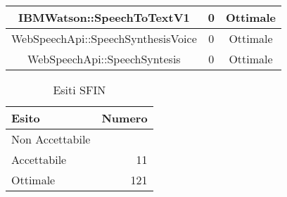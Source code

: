 \begin{longtable}{|c|c|c|}
\hline IBMWatson::SpeechToTextV1 & 0 & Ottimale \\
\hline WebSpeechApi::SpeechSynthesisVoice & 0 & Ottimale \\
\hline WebSpeechApi::SpeechSyntesis & 0 & Ottimale \\
\hline \end{longtable}\begin{table}[h]
\centering
\begin{tabular}{l r}
	\hline
	\rule[-0.3cm]{0cm}{0.8cm}
	\textbf{Esito} & \textbf{Numero} \\
	\hline
	\rule[0cm]{0cm}{0.4cm}
	Non Accettabile &  \\
	\rule[0cm]{0cm}{0.4cm}
	Accettabile & 11 \\
	\rule[0cm]{0cm}{0.4cm}
	Ottimale & 121 \\
	\hline
\end{tabular}
\caption{Esiti SFIN}
\end{table}